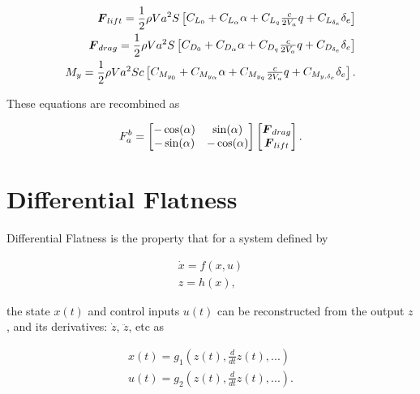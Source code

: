 \begin{align}
    \label{eq:totalAerodynamicForcesMoments}
    \boldsymbol{F}_{lift} = \frac{1}{2} \rho Va^2 S
    \begin{bmatrix}
        C_{L_0} + C_{L_\alpha} \alpha + C_{L_q} \frac{c}{2 V_a}q + C_{L_{\delta_e}} \delta_e
    \end{bmatrix}\\
    \boldsymbol{F}_{drag} = \frac{1}{2} \rho Va^2 S
    \begin{bmatrix}
        C_{D_0} + C_{D_\alpha} \alpha + C_{D_q} \frac{c}{2 V_a}q + C_{D_{\delta_e}} \delta_e
    \end{bmatrix}\\
    M_y = \frac{1}{2} \rho Va^2 S c
    \begin{bmatrix}
        C_{M_{y_0}} + C_{M_{y_\alpha}} \alpha + C_{M_{y_q}} \frac{c}{2 V_a}q + C_{M_{y, \delta_e}} \delta_e
    \end{bmatrix}
    .
\end{align}

These equations are recombined as

\begin{align}
    F^b_{a} = 
    \begin{bmatrix}
        -\cos(\alpha) & \sin(\alpha)\\
        -\sin(\alpha) & -\cos(\alpha)
    \end{bmatrix}
    \begin{bmatrix}
      \boldsymbol{F}_{drag}\\
      \boldsymbol{F}_{lift}
    \end{bmatrix}
    .
\end{align}

\section{Differential Flatness}

Differential Flatness is the property that for a system defined by

\begin{align*}
    \dot{x} = f(x,u)\\
    z = h(x),
\end{align*}

the state $x(t)$ and control inputs $u(t)$ can be reconstructed from the output $z$, and its derivatives: $\dot{z}$, $\ddot{z}$, etc as

\begin{align*}
    x(t) = g_1 \left(z(t), \frac{d}{dt} z(t), ...\right)\\
    u(t) = g_2 \left(z(t), \frac{d}{dt} z(t), ...\right)
    .
\end{align*}

